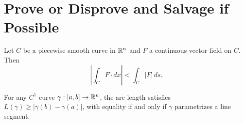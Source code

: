 \documentclass{homework}
\begin{document}
\section{Prove or Disprove and Salvage if Possible}

\begin{problem}
  Let $C$ be a piecewise smooth curve in $\mathbb{R}^n$ and $F$ a continuous vector field on $C$.
  Then
  \[
    \left|\int_C F\cdot dx\right| < \int_C |F|\,ds.
  \]
\end{problem}

\begin{problem}
  For any $C^1$ curve $\gamma:[a,b]\to\mathbb{R}^n$, the arc length satisfies \(L(\gamma)\ge|\gamma(b)-\gamma(a)|\),
  with equality if and only if $\gamma$ parametrizes a line segment.
\end{problem}
\end{document}
